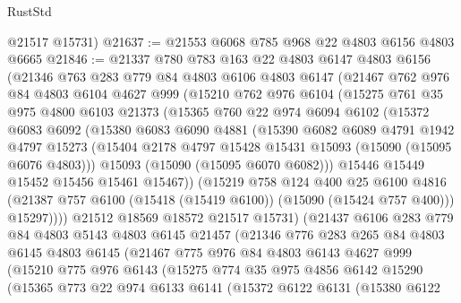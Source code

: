 \begin{lexlean}{RustStd}
\begin{coremodule}
      @21517
      @15731)
@21637 := @21553 @6068 @785 @968 @22 @4803 @6156 @4803 @6665
@21846 := @21337
    @780
    @783
    @163
    @22
    @4803
    @6147
    @4803
    @6156
    (@21346
      @763
      @283
      @779
      @84
      @4803
      @6106
      @4803
      @6147
      (@21467
        @762
        @976
        @84
        @4803
        @6104
        @4627
        @999
        (@15210
          @762
          @976
          @6104
          (@15275
            @761
            @35
            @975
            @4800
            @6103
            @21373
            (@15365
              @760
              @22
              @974
              @6094
              @6102
              (@15372
                @6083
                @6092
                (@15380
                  @6083
                  @6090
                  @4881
                  (@15390
                    @6082
                    @6089
                    @4791
                    @1942
                    @4797
                    @15273
                    (@15404 @2178 @4797 @15428 @15431 @15093 (@15090 (@15095 @6076 @4803)))
                    @15093
                    (@15090 (@15095 @6070 @6082)))
                  @15446
                  @15449
                  @15452
                  @15456
                  @15461
                  @15467))
              (@15219
                @758
                @124
                @400
                @25
                @6100
                @4816
                (@21387 @757 @6100 (@15418 (@15419 @6100)) (@15090 (@15424 @757 @400)))
                @15297))))
        @21512
        @18569
        @18572
        @21517
        @15731)
      (@21437
        @6106
        @283
        @779
        @84
        @4803
        @5143
        @4803
        @6145
        @21457
        (@21346
          @776
          @283
          @265
          @84
          @4803
          @6145
          @4803
          @6145
          (@21467
            @775
            @976
            @84
            @4803
            @6143
            @4627
            @999
            (@15210
              @775
              @976
              @6143
              (@15275
                @774
                @35
                @975
                @4856
                @6142
                @15290
                (@15365
                  @773
                  @22
                  @974
                  @6133
                  @6141
                  (@15372
                    @6122
                    @6131
                    (@15380
                      @6122

\end{coremodule}
\end{lexlean}
